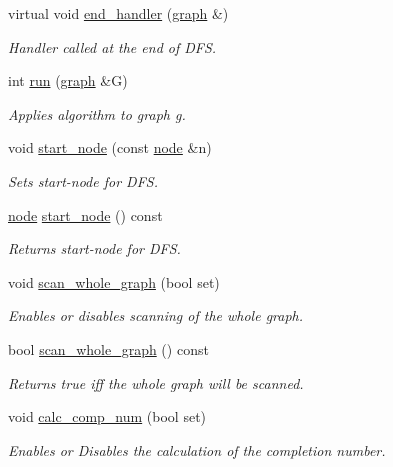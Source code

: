 \begin{DoxyCompactItemize}
virtual void \mbox{\hyperlink{classbiconnectivity_a2583331a4561f3db221ab674d2e5d75e}{end\+\_\+handler}} (\mbox{\hyperlink{classgraph}{graph}} \&)
\begin{DoxyCompactList}\small\item\em Handler called at the end of D\+FS. \end{DoxyCompactList}\item 
int \mbox{\hyperlink{classdfs_af0863b8974d5fd58cd0375c78ed8163b}{run}} (\mbox{\hyperlink{classgraph}{graph}} \&G)
\begin{DoxyCompactList}\small\item\em Applies algorithm to graph g. \end{DoxyCompactList}\item 
void \mbox{\hyperlink{classdfs_aad21fd0d3036350fd341f877d5747852}{start\+\_\+node}} (const \mbox{\hyperlink{classnode}{node}} \&n)
\begin{DoxyCompactList}\small\item\em Sets start-\/node for D\+FS. \end{DoxyCompactList}\item 
\mbox{\hyperlink{classnode}{node}} \mbox{\hyperlink{classdfs_a7688d8eaf1308438820fec2ffe21257c}{start\+\_\+node}} () const
\begin{DoxyCompactList}\small\item\em Returns start-\/node for D\+FS. \end{DoxyCompactList}\item 
void \mbox{\hyperlink{classdfs_aa7c864a6f3a120720138b187b3ed95b5}{scan\+\_\+whole\+\_\+graph}} (bool set)
\begin{DoxyCompactList}\small\item\em Enables or disables scanning of the whole graph. \end{DoxyCompactList}\item 
bool \mbox{\hyperlink{classdfs_a025ed2d6101a7b9f72578a52b484ef50}{scan\+\_\+whole\+\_\+graph}} () const
\begin{DoxyCompactList}\small\item\em Returns true iff the whole graph will be scanned. \end{DoxyCompactList}\item 
void \mbox{\hyperlink{classdfs_a70862ea715c52eb95fb704afd3a6e676}{calc\+\_\+comp\+\_\+num}} (bool set)
\begin{DoxyCompactList}\small\item\em Enables or Disables the calculation of the completion number. \end{DoxyCompactList}\item 

\end{DoxyCompactItemize}
